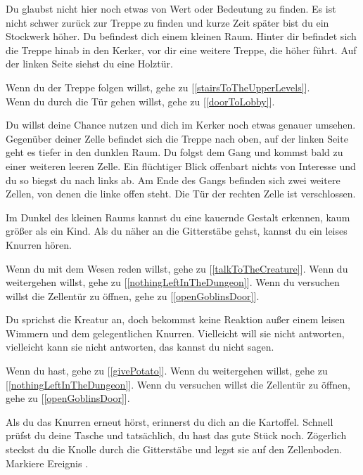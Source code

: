 Du glaubst nicht hier noch etwas von Wert oder Bedeutung zu finden. Es ist nicht schwer zurück zur Treppe zu finden und kurze Zeit später bist du ein Stockwerk höher. Du befindest dich einem kleinen Raum. Hinter dir befindet sich die Treppe hinab in den Kerker, vor dir eine weitere Treppe, die höher führt. Auf der linken Seite siehst du eine Holztür.

Wenn du der Treppe folgen willst, gehe zu [\ref{stairsToTheUpperLevels}].
\\Wenn du durch die Tür gehen willst, gehe zu [\ref{doorToLobby}].

Du willst deine Chance nutzen und dich im Kerker noch etwas genauer umsehen. Gegenüber deiner Zelle befindet sich die Treppe nach oben, auf der linken Seite geht es tiefer in den dunklen Raum. Du folgst dem Gang und kommst bald zu einer weiteren leeren Zelle. Ein flüchtiger Blick offenbart nichts von Interesse und du so biegst du nach links ab. Am Ende des Gangs befinden sich zwei weitere Zellen, von denen die linke offen steht. Die Tür der rechten Zelle ist verschlossen.

Im Dunkel des kleinen Raums kannst du eine kauernde Gestalt erkennen, kaum größer als ein Kind.
Als du näher an die Gitterstäbe gehst, kannst du ein leises Knurren hören.

Wenn du mit dem Wesen reden willst, gehe zu [\ref{talkToTheCreature}].
Wenn du weitergehen willst, gehe zu [\ref{nothingLeftInTheDungeon}].
Wenn du versuchen willst die Zellentür zu öffnen, gehe zu [\ref{openGoblinsDoor}].


Du sprichst die Kreatur an, doch bekommst keine Reaktion außer einem leisen Wimmern und dem gelegentlichen Knurren. Vielleicht will sie nicht antworten, vielleicht kann sie nicht antworten, das kannst du nicht sagen.

Wenn du  hast, gehe zu [\ref{givePotato}].
Wenn du weitergehen willst, gehe zu [\ref{nothingLeftInTheDungeon}].
Wenn du versuchen willst die Zellentür zu öffnen, gehe zu [\ref{openGoblinsDoor}].


Als du das Knurren erneut hörst, erinnerst du dich an die Kartoffel. Schnell prüfst du deine Tasche und tatsächlich, du hast das gute Stück noch. Zögerlich steckst du die Knolle durch die Gitterstäbe und legst sie auf den Zellenboden. Markiere Ereignis .

